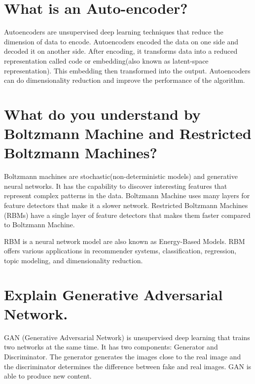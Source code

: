 \documentclass[
]{book}
\begin{document}
\hypertarget{what-is-an-auto-encoder}{%
\section{What is an Auto-encoder?}\label{what-is-an-auto-encoder}}

Autoencoders are unsupervised deep learning techniques that reduce the dimension of data to encode. Autoencoders encoded the data on one side and decoded it on another side. After encoding, it transforms data into a reduced representation called code or embedding(also known as latent-space representation). This embedding then transformed into the output. Autoencoders can do dimensionality reduction and improve the performance of the algorithm.

\hypertarget{what-do-you-understand-by-boltzmann-machine-and-restricted-boltzmann-machines}{%
\section{What do you understand by Boltzmann Machine and Restricted Boltzmann Machines?}\label{what-do-you-understand-by-boltzmann-machine-and-restricted-boltzmann-machines}}

Boltzmann machines are stochastic(non-deterministic models) and generative neural networks. It has the capability to discover interesting features that represent complex patterns in the data. Boltzmann Machine uses many layers for feature detectors that make it a slower network. Restricted Boltzmann Machines (RBMs) have a single layer of feature detectors that makes them faster compared to Boltzmann Machine.

RBM is a neural network model are also known as Energy-Based Models. RBM offers various applications in recommender systems, classification, regression, topic modeling, and dimensionality reduction.

\hypertarget{explain-generative-adversarial-network.}{%
\section{Explain Generative Adversarial Network.}\label{explain-generative-adversarial-network.}}

GAN (Generative Adversarial Network) is unsupervised deep learning that trains two networks at the same time. It has two components: Generator and Discriminator. The generator generates the images close to the real image and the discriminator determines the difference between fake and real images. GAN is able to produce new content.
\end{document}

